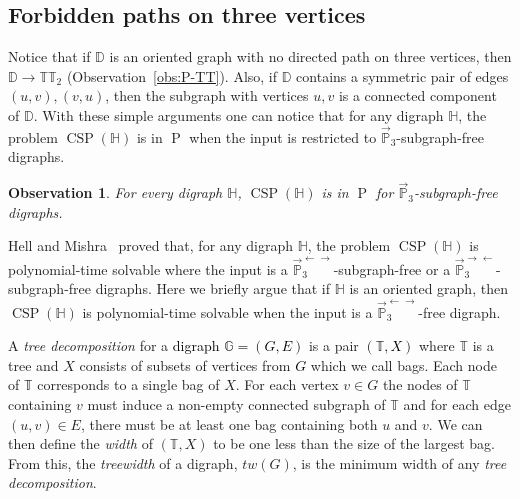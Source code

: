\documentclass{article}
\newtheorem{observation}[theorem]{Observation}
\theoremstyle{definition}
\theoremstyle{remark}
\newcommand{\blue}[1]{\textcolor{black}{#1}}
\DeclareMathOperator{\cP}{P}
\DeclareMathOperator{\CSP}{CSP}
\newcommand{\bD}{{\mathbb D}}
\newcommand{\bG}{{\mathbb G}}
\newcommand{\bH}{{\mathbb H}}
\newcommand{\bP}{{\mathbb P}}
\newcommand{\bT}{{\mathbb T}}
\begin{document}
 
\subsection*{Forbidden paths on three vertices}

Notice that if $\bD$ is an oriented graph with no directed path on three vertices, 
then $\bD\to \bT\bT_2$ (Observation~\ref{obs:P-TT}). Also, if $\bD$ contains a
symmetric pair of edges $(u,v),(v,u)$, then the subgraph with vertices $u,v$
is a connected component of $\bD$. With these simple arguments one can notice
that for any digraph $\bH$, the problem $\CSP(\bH)$ is in $\cP$ when the
input is restricted to $\vec{\bP}_3$-subgraph-free digraphs.

\begin{observation}\label{obs:general-P3}
    For every digraph $\bH$, $\CSP(\bH)$ is in $\cP$ for $\vec{\bP}_3$-subgraph-free
    digraphs. 
\end{observation}

Hell and Mishra~\cite{HM14} proved that, for any digraph $\bH$, the problem $\CSP(\bH)$ is polynomial-time
solvable where the input is a $\vec{\bP}_3^{\leftarrow\rightarrow}$-subgraph-free or a
$\vec{\bP}_3^{\rightarrow\leftarrow}$-subgraph-free digraphs. 
Here we briefly argue that if $\bH$ is an oriented graph, then $\CSP(\bH)$ is polynomial-time
solvable when the input is a $\vec{\bP}_3^{\leftarrow\rightarrow}$-free digraph. 

A \textit{tree decomposition} for a \blue{digraph} \blue{$\bG=(G,E)$} is a pair \blue{$(\bT,X)$} where $\bT$ is a tree
and $X$ consists of subsets of vertices from \blue{$G$} which we call bags. Each node of \blue{$\bT$} corresponds to a single
bag of $X$. For each vertex $v \in G$ the nodes of $\bT$ containing $v$ must induce a non-empty connected subgraph of
$\bT$ and for each edge $(u,v) \in E$, there must be at least one bag containing both $u$ and $v$. We can then define the \textit{width} of $(\bT,X)$ to be one less than the size of the largest bag. From this, the \textit{treewidth} of a digraph, $\mathit{tw}(G)$, is the minimum width of any \textit{tree decomposition}.
\end{document}
